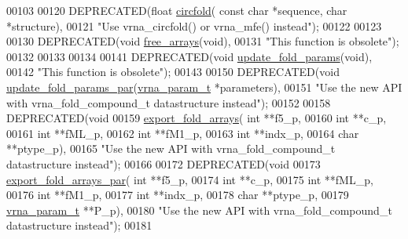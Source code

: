 \begin{DoxyCode}
00103 
00120 DEPRECATED(\textcolor{keywordtype}{float} \hyperlink{group__mfe__global__deprecated_ga4ac63ab3e8d9a80ced28b8052d94e423}{circfold}( \textcolor{keyword}{const} \textcolor{keywordtype}{char} *sequence, \textcolor{keywordtype}{char} *structure),
00121 \textcolor{stringliteral}{"Use vrna\_circfold() or vrna\_mfe() instead"});
00122 
00123 
00130 DEPRECATED(\textcolor{keywordtype}{void} \hyperlink{group__mfe__global__deprecated_ga107fdfe5fd641868156bfd849f6866c7}{free\_arrays}(\textcolor{keywordtype}{void}),
00131 \textcolor{stringliteral}{"This function is obsolete"});
00132 
00133 
00134 
00141 DEPRECATED(\textcolor{keywordtype}{void} \hyperlink{group__mfe__global__deprecated_ga41bf8f6fa15b94471f7095cad9f0ccf3}{update\_fold\_params}(\textcolor{keywordtype}{void}),
00142 \textcolor{stringliteral}{"This function is obsolete"});
00143 
00150 DEPRECATED(\textcolor{keywordtype}{void} \hyperlink{group__mfe__global__deprecated_gae66dc422efb8f5d56717d92d6002a9f8}{update\_fold\_params\_par}(\hyperlink{group__energy__parameters_structvrna__param__s}{vrna\_param\_t} *parameters),
00151 \textcolor{stringliteral}{"Use the new API with vrna\_fold\_compound\_t datastructure instead"});
00152 
00158 DEPRECATED(\textcolor{keywordtype}{void}
00159 \hyperlink{group__mfe__global__deprecated_ga99641b8dbb40891da5490d3cc271e607}{export\_fold\_arrays}( \textcolor{keywordtype}{int} **f5\_p,
00160                     \textcolor{keywordtype}{int} **c\_p,
00161                     \textcolor{keywordtype}{int} **fML\_p,
00162                     \textcolor{keywordtype}{int} **fM1\_p,
00163                     \textcolor{keywordtype}{int} **indx\_p,
00164                     \textcolor{keywordtype}{char} **ptype\_p),
00165 \textcolor{stringliteral}{"Use the new API with vrna\_fold\_compound\_t datastructure instead"});
00166 
00172 DEPRECATED(\textcolor{keywordtype}{void}
00173 \hyperlink{group__mfe__global__deprecated_ga6606ec0ec964ea506fdadb997a1a5328}{export\_fold\_arrays\_par}( \textcolor{keywordtype}{int} **f5\_p,
00174                         \textcolor{keywordtype}{int} **c\_p,
00175                         \textcolor{keywordtype}{int} **fML\_p,
00176                         \textcolor{keywordtype}{int} **fM1\_p,
00177                         \textcolor{keywordtype}{int} **indx\_p,
00178                         \textcolor{keywordtype}{char} **ptype\_p,
00179                         \hyperlink{group__energy__parameters_structvrna__param__s}{vrna\_param\_t} **P\_p),
00180 \textcolor{stringliteral}{"Use the new API with vrna\_fold\_compound\_t datastructure instead"});
00181 

\end{DoxyCode}
